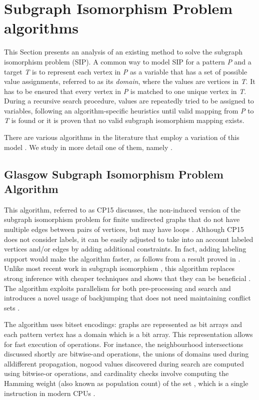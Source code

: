 \documentclass{l4proj}
\begin{document}
\section{Subgraph Isomorphism Problem algorithms}
This Section presents an analysis of an existing method to solve the subgraph isomorphism problem (SIP). A common way to model SIP for a pattern \emph{P} and a target \emph{T} is to represent each vertex in \emph{P} as a variable that has a set of possible value assignments, referred to as its \emph{domain}, where the values are vertices in \emph{T}. It has to be ensured that every vertex in \emph{P} is matched to one unique vertex in \emph{T}. During a recursive search procedure, values are repeatedly tried to be assigned to variables, following an algorithm-specific heuristics until valid mapping from \emph{P} to \emph{T} is found or it is proven that no valid subgraph isomorphism mapping exists.
 
There are various algorithms in the literature that employ a variation of this model \cite{Solnon:2010, Ullmann:1976, Regin:1995, Larrosa:2002, Solnon:2010a, CP2015}. We study in more detail one of them, namely \cite{CP2015}.

\subsection{Glasgow Subgraph Isomorphism Problem Algorithm}
\label{sec:sippatrick}
This algorithm, referred to as CP15 discusses, the non-induced version of the subgraph isomorphism problem for finite undirected graphs that do not have multiple edges between pairs of vertices, but may have loops \cite{CP2015}. Although CP15 does not consider labels, it can be easily adjusted to take into an account labeled vertices and/or edges by adding additional constraints. In fact, adding labeling support would make the algorithm faster, as follows from a result proved in \cite{Ciaran:2016}. Unlike most recent work in subgraph isomorphism \cite{Solnon:2010a,SND}, this algorithm replaces strong inference with cheaper techniques and shows that they can be beneficial \cite{CP2015}. The algorithm exploits parallelism for both pre-processing and search and introduces a novel usage of backjumping \cite{Prosser:1993} that does not need maintaining conflict sets \cite{CP2015}. 

The algorithm uses bitset encodings: graphs are represented as bit arrays and each pattern vertex has a domain which is a bit array. This representation allows for fast execution of operations. For instance, the neighbourhood intersections discussed shortly are bitwise-and operations, the unions of domains used during alldifferent propagation, nogood values discovered during search are computed using bitwise-or operations, and cardinality checks involve computing the Hamming weight (also known as population count) of the set \cite{Reed:1954}, which is a single instruction in modern CPUs \cite{CP2015}.  
\end{document}
